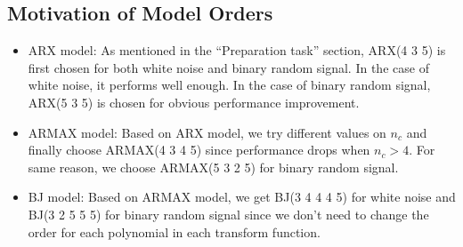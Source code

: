 \documentclass[10pt,a4paper]{article}
\begin{document}
\subsection{Motivation of Model Orders}
\begin{itemize}
\item ARX model: As mentioned in the ``Preparation task'' section, ARX(4 3 5) is first chosen for both white noise and binary random signal. In the case of white noise, it performs well enough. In the case of binary random signal, ARX(5 3 5) is chosen for obvious performance improvement.
\item ARMAX model: Based on ARX model, we try different values on $n_{c}$ and finally choose ARMAX(4 3 4 5) since performance drops when $n_{c} > 4$. For same reason, we choose ARMAX(5 3 2 5) for binary random signal.
\item BJ model: Based on ARMAX model, we get BJ(3 4 4 4 5) for white noise and BJ(3 2 5 5 5) for binary random signal since we don't need to change the order for each polynomial in each transform function.
\end{itemize}
\end{document}
